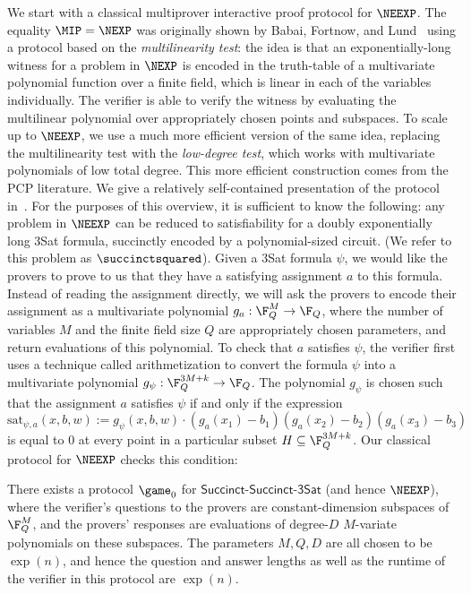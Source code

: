 We start with a classical multiprover interactive proof protocol for
$\NEEXP$. The equality $\MIP = \NEXP$ was originally shown by Babai,
Fortnow, and Lund~\cite{BFL91} using a protocol based on the \emph{multilinearity
  test}: the idea is that an exponentially-long witness for a problem
in $\NEXP$ is encoded in the truth-table of a multivariate polynomial
function over a finite field, which is linear in each of the variables
individually. The verifier is able to verify the witness
by evaluating the multilinear polynomial over appropriately chosen
points and subspaces. To scale up to $\NEEXP$, we use a much more
efficient version of the same idea, replacing the multilinearity test
with the \emph{low-degree test}, which works with multivariate
polynomials of low total degree. This more efficient construction
comes from the PCP literature. We give a relatively self-contained
presentation of the protocol in~. For the
purposes of this overview, it is sufficient to know the following: any
problem in $\NEEXP$ can be reduced to satisfiability for a doubly exponentially long 3Sat
formula, succinctly encoded by a polynomial-sized circuit. (We refer
to this problem as $\succinctsquared$). Given a 3Sat formula
$\psi$, we would like the provers to prove to us that they have a
satisfying assignment $a$ to this formula. Instead of reading the
assignment directly, we will ask the provers to
encode their assignment as a multivariate polynomial $g_a: \F_Q^M \to
\F_Q$, where the number of variables $M$ and the finite field size $Q$
are appropriately chosen parameters, and return evaluations of this polynomial. To check that $a$
satisfies $\psi$, the verifier first uses a technique called
arithmetization to convert the
formula $\psi$ into a multivariate polynomial $g_{\psi}: \F_Q^{3M + k}
\to \F_Q$. The polynomial $g_{\psi}$ is chosen such that the assignment $a$
satisfies $\psi$ if and only if the expression
\[ \mathrm{sat}_{\psi,a}(x,b, w) := g_{\psi}(x,b,w) \cdot (g_a(x_1)
  -b_1)(g_a(x_2) - b_2)(g_a(x_3) - b_3) \]
is equal to $0$ at every point in a particular subset $H \subseteq \F_Q^{3M
  +k}$. Our classical protocol for $\NEEXP$ checks this condition:
\begin{infthm}
There exists a protocol $\game_0$ for $\mathsf{Succinct}$-$\mathsf{Succinct}$-$\mathsf{3Sat}$ (and hence
$\NEEXP$), where the verifier's questions to the provers are
constant-dimension subspaces of $\F_Q^{M}$, and the provers' responses
are evaluations of degree-$D$ $M$-variate polynomials on these
subspaces. The parameters $M, Q, D$ are all chosen to be $\exp(n)$,
and hence the question and answer lengths as well as the runtime of
the verifier in this protocol are
$\exp(n)$. 
\end{infthm}

